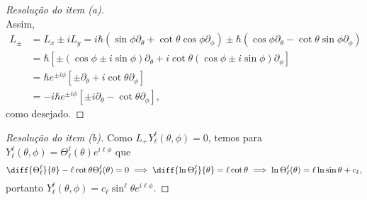 \begin{proof}[Resolução do item (a)]
\begin{equation*}
    \end{equation*}
    Assim,
    \begin{align*}
        L_\pm &= L_x \pm i L_y = i\hbar\left(\sin\phi \partial_\theta + \cot\theta \cos\phi\partial_\phi\right) \pm \hbar \left(\cos\phi \partial_\theta- \cot\theta \sin\phi \partial_\phi\right)\\
              &= \hbar \left[\pm\left(\cos\phi \pm i \sin\phi\right)\partial_\theta  + i\cot\theta\left(\cos\phi \pm i\sin\phi\right)\partial_\phi\right]\\
              &= \hbar e^{\pm i \phi}\left[\pm\partial_\theta + i\cot\theta \partial_\phi\right]\\
              &= -i\hbar e^{\pm i \phi} \left[\pm i\partial_\theta - \cot\theta \partial_\phi\right],
    \end{align*}
    como desejado.
\end{proof}
\begin{proof}[Resolução do item (b)]
    Como \(L_+ Y_\ell^\ell(\theta,\phi) = 0\), temos para \(Y_{\ell}^\ell(\theta,\phi) = \Theta_\ell^\ell(\theta)e^{i\ell \phi}\) que
    \begin{equation*}
        \diff{\Theta_\ell^\ell}{\theta} - \ell\cot\theta \Theta_\ell^\ell(\theta) = 0 \implies \diff{\ln\Theta_\ell^\ell}{\theta} = \ell \cot\theta \implies \ln \Theta_\ell^\ell(\theta) = \ell \ln \sin\theta + c_\ell,
    \end{equation*}
    portanto \(Y_\ell^\ell(\theta, \phi) = c_\ell \sin^\ell\theta e^{i\ell\phi}\).
\end{proof}
